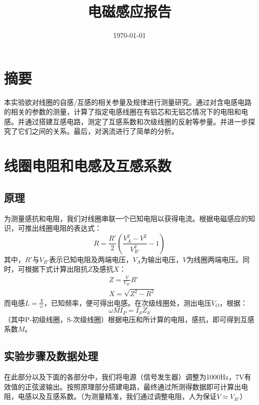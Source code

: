 \documentclass[12pt]{article}
\title{电磁感应报告}
\author{}
\date{\today}
\begin{document}
\maketitle
\setlength{\parindent}{2em}

\section*{摘要}
本实验欲对线圈的自感/互感的相关参量及规律进行测量研究。通过对含电感电路的相关的参数的测量，计算了指定电感线圈在有铝芯和无铝芯情况下的电阻和电感。并通过搭建互感电路，测定了互感系数和次级线圈的反射等参量。并进一步探究了它们之间的关系。最后，对涡流进行了简单的分析。

\section{线圈电阻和电感及互感系数}

\subsection*{原理}
为测量感抗和电阻，我们对线圈串联一个已知电阻以获得电流。根据电磁感应的知识，可推出线圈电阻的表达式：
\begin{equation}
    R = \frac{R'}{2}(\frac{V_A^2-V^2}{V_{R'}^2}-1)
    \label{eq:1}
\end{equation}
其中，$R'$与$V_{R'}$表示已知电阻及两端电压，$V_A$为输出电压，$V$为线圈两端电压。同时，可根据下式计算出阻抗$Z$及感抗$X$：
\begin{equation}
    \begin{split}
        &Z = \frac{V}{V_{R'}}R' \\
        &X = \sqrt{Z^2-R^2}
    \end{split}
    \label{eq:2}
\end{equation}
而电感$L=\frac{X}{\omega}$，已知频率，便可得出电感。在次级线圈处，测出电压$V_O$，根据：
\begin{equation}
    \omega M I_P = I_S Z_S
    \label{eq:3}
\end{equation}
（其中P-初级线圈，S-次级线圈）根据电压和所计算的电阻，感抗，即可得到互感系数$M$。

\subsection*{实验步骤及数据处理}
在此部分以及下面的各部分中，我们将电源（信号发生器）调整为1000Hz，7V有效值的正弦波输出。按照原理部分搭建电路，最终通过所测得数据即可计算出电阻，电感以及互感系数。（为测量精准，我们通过调整电阻，人为保证$V \approx V_{R'}$）
\end{document}
